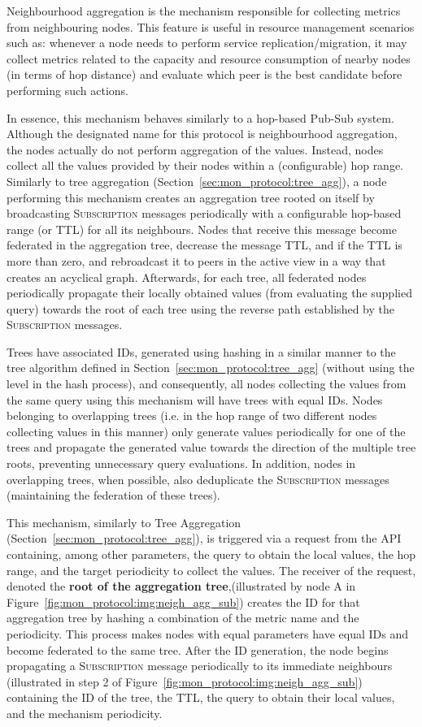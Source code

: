 Neighbourhood aggregation is the mechanism responsible for collecting metrics from neighbouring nodes. This feature is useful in resource management scenarios such as: whenever a node needs to perform service replication/migration, it may collect metrics related to the capacity and resource consumption of nearby nodes (in terms of hop distance) and evaluate which peer is the best candidate before performing such actions. 

In essence, this mechanism behaves similarly to a hop-based Pub-Sub system. Although the designated name for this protocol is neighbourhood aggregation, the nodes actually do not perform aggregation of the values. Instead, nodes collect all the values provided by their nodes within a (configurable) hop range. Similarly to tree aggregation (Section~\ref{sec:mon_protocol:tree_agg}), a node performing this mechanism creates an aggregation tree rooted on itself by broadcasting \textsc{Subscription} messages periodically with a configurable hop-based range (or TTL) for all its neighbours. Nodes that receive this message become federated in the aggregation tree, decrease the message TTL, and if the TTL is more than zero, and rebroadcast it to peers in the active view in a way that creates an acyclical graph. Afterwards, for each tree, all federated nodes periodically propagate their locally obtained values (from evaluating the supplied query) towards the root of each tree using the reverse path established by the \textsc{Subscription} messages. 

Trees have associated IDs, generated using hashing in a similar manner to the tree algorithm defined in Section~\ref{sec:mon_protocol:tree_agg} (without using the level in the hash process), and consequently, all nodes collecting the values from the same query using this mechanism will have trees with equal IDs. Nodes belonging to overlapping trees (i.e. in the hop range of two different nodes collecting values in this manner) only generate values periodically for one of the trees and propagate the generated value towards the direction of the multiple tree roots, preventing unnecessary query evaluations. In addition, nodes in overlapping trees, when possible, also deduplicate the \textsc{Subscription} messages (maintaining the federation of these trees).

This mechanism, similarly to Tree Aggregation (Section~\ref{sec:mon_protocol:tree_agg}), is triggered via a request from the API containing, among other parameters, the query to obtain the local values, the hop range, and the target periodicity to collect the values. The receiver of the request, denoted the \textbf{root of the aggregation tree},(illustrated by node A in Figure~\ref{fig:mon_protocol:img:neigh_agg_sub}) creates the ID for that aggregation tree by hashing a combination of the metric name and the periodicity. This process makes nodes with equal parameters have equal IDs and become federated to the same tree. After the ID generation, the node begins propagating a \textsc{Subscription} message periodically to its immediate neighbours (illustrated in step 2 of Figure~\ref{fig:mon_protocol:img:neigh_agg_sub}) containing the ID of the tree, the TTL, the query to obtain their local values, and the mechanism periodicity. 

